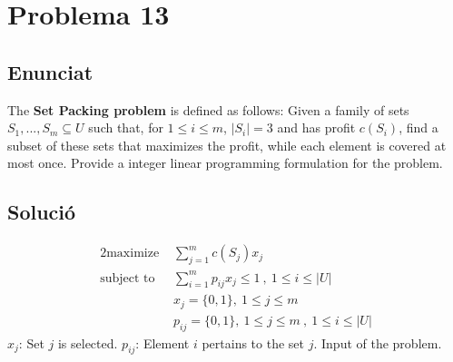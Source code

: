 \section{Problema 13}
\subsection{Enunciat}
The \textbf{Set Packing problem} is defined as follows: 
\newline 
Given a family of sets $S_1,...,S_m \subseteq U$ such that, for $1 \leq i \leq m$, $|S_i| = 3$ and has profit $c(S_i)$, find a subset of these sets that maximizes the profit, while each element is covered at most once. Provide a integer linear programming formulation for the problem.
\subsection{Solució}
\begin{alignat*}{2}
    \text{maximize }   & \sum_{j=1}^m c(S_j)x_j  \\
    \text{subject to } & \sum_{i=1}^{m} p_{ij}x_j \leq 1 \ , \  1\leq i\leq |U|\\
                       & x_j = \{0,1\},\  1\leq j\leq m\\
                       & p_{ij} = \{0,1\},\  1\leq j\leq m\ ,\  1\leq i\leq |U|
\end{alignat*}
$x_j$: Set $j$ is selected.
\newline
$p_{ij}$: Element $i$ pertains to the set $j$. Input of the problem. 
